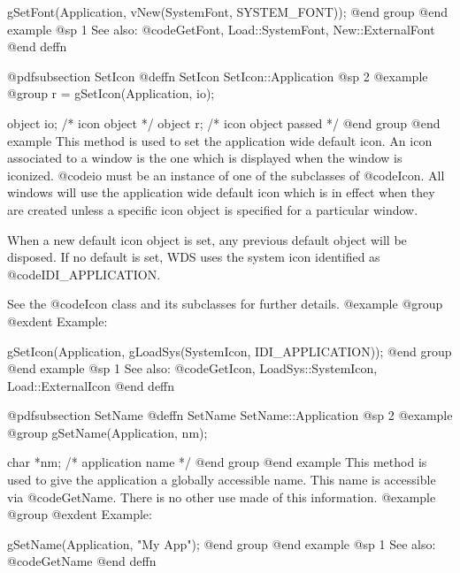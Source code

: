 gSetFont(Application, vNew(SystemFont, SYSTEM_FONT));
@end group
@end example
@sp 1
See also:  @code{GetFont, Load::SystemFont, New::ExternalFont}
@end deffn
















@pdfsubsection {SetIcon}
@deffn {SetIcon} SetIcon::Application
@sp 2
@example
@group
r = gSetIcon(Application, io);

object  io;     /*  icon object         */
object  r;      /*  icon object passed  */
@end group
@end example
This method is used to set the application wide default icon.  An icon
associated to a window is the one which is displayed when the window is
iconized.  @code{io} must be an instance of one of the subclasses of
@code{Icon}.  All windows will use the application wide default icon
which is in effect when they are created unless a specific icon object
is specified for a particular window.

When a new default icon object is set, any previous default object
will be disposed.  If no default is set, WDS uses the system icon
identified as @code{IDI_APPLICATION}.

See the @code{Icon} class and its subclasses for further details.
@example
@group
@exdent Example:

gSetIcon(Application, gLoadSys(SystemIcon, IDI_APPLICATION));
@end group
@end example
@sp 1
See also:  @code{GetIcon, LoadSys::SystemIcon, Load::ExternalIcon}
@end deffn












@pdfsubsection {SetName}
@deffn {SetName} SetName::Application
@sp 2
@example
@group
gSetName(Application, nm);

char    *nm;    /*  application name  */
@end group
@end example
This method is used to give the application a globally accessible name.
This name is accessible via @code{GetName}.  There is no other use
made of this information.
@example
@group
@exdent Example:

gSetName(Application, "My App");
@end group
@end example
@sp 1
See also:  @code{GetName}
@end deffn















